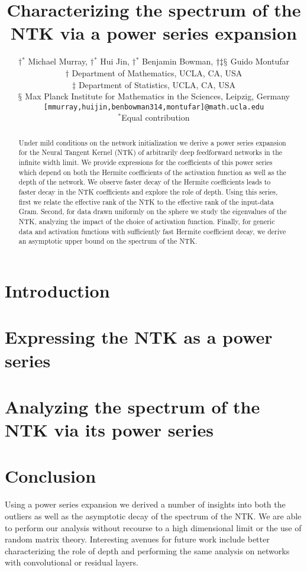 \documentclass{article} %
\title{Characterizing the spectrum of the NTK via a power series expansion}
\author{$\dagger$$^*$ Michael Murray, $\dagger$$^*$ Hui Jin, $\dagger$$^*$ Benjamin Bowman, $\dagger \ddag \mathsection$ Guido Montufar\\
  $\dagger$ Department of Mathematics, UCLA, CA, USA\\
  $\ddag$ Department of Statistics, UCLA, CA, USA\\
  $\mathsection$ Max Planck Institute for Mathematics in the Sciences, Leipzig, Germany \\
  \texttt{[mmurray,huijin,benbowman314,montufar]@math.ucla.edu} \\
  $^*$Equal contribution
}
\begin{document}
\maketitle
\begin{abstract}
Under mild conditions on the network initialization we derive a power series expansion for the Neural Tangent Kernel (NTK) of arbitrarily deep feedforward networks in the infinite width limit. We provide expressions for the coefficients of this power series which depend on both the Hermite coefficients of the activation function as well as the depth of the network. We observe faster decay of the Hermite coefficients leads to faster decay in the NTK coefficients and explore the role of depth. Using this series, first we relate the effective rank of the NTK to the effective rank of the input-data Gram. Second, for data drawn uniformly on the sphere we study the eigenvalues of the NTK, analyzing the impact of the choice of activation function. Finally, for generic data and activation functions with sufficiently fast Hermite coefficient decay, we derive an asymptotic upper bound on the spectrum of the NTK.
\end{abstract}


\section{Introduction} \label{sec:intro}



\section{Expressing the NTK as a power series}\label{sec:power_series}



\section{Analyzing the spectrum of the NTK via its power series}\label{sec:ntk_spectrum}




\section{Conclusion} 
Using a power series expansion we derived a number of insights into both the outliers as well as the asymptotic decay of the spectrum of the NTK.  We are able to perform our analysis without recourse to a high dimensional limit or the use of random matrix theory. Interesting avenues for future work include better characterizing the role of depth and performing the same analysis on networks with convolutional or residual layers.  
\end{document}
